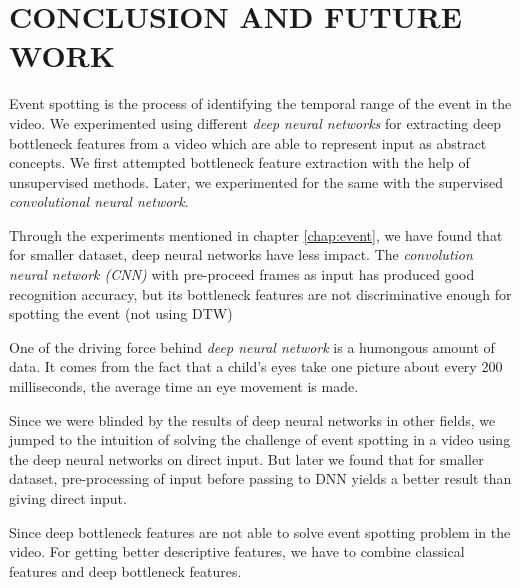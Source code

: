 \chapter{CONCLUSION AND FUTURE WORK} 
\label{chap:concl}
Event spotting is the process of identifying the temporal range of the event in the video.  We experimented using  different \textit{deep neural networks} for extracting deep bottleneck features from a video which are able to represent input as abstract concepts.  We first attempted bottleneck feature extraction with the help of unsupervised methods.  Later, we experimented for the same with the supervised \textit{convolutional neural network}.

Through the experiments mentioned in chapter \ref{chap:event}, we have found that for smaller dataset, deep neural networks have less impact.  The \textit{convolution neural network (CNN)} with pre-proceed frames as input has produced good recognition accuracy, but its bottleneck features are not discriminative enough for spotting the event (not using DTW)

One of the driving force behind \textit{deep neural network} is a humongous amount of data.  It comes from the fact that a child's eyes take one picture about every 200 milliseconds, the average time an eye movement is made. 

Since we were blinded by the results of deep neural networks in other fields, we jumped to the intuition of solving the challenge of event spotting in a video using the deep neural networks on direct input.  But later we found that for smaller dataset, pre-processing of input before passing to DNN yields a better result than giving direct input.

Since deep bottleneck features are not able to solve event spotting problem in the video.  For getting better descriptive features, we have to combine classical features and deep bottleneck features.  

